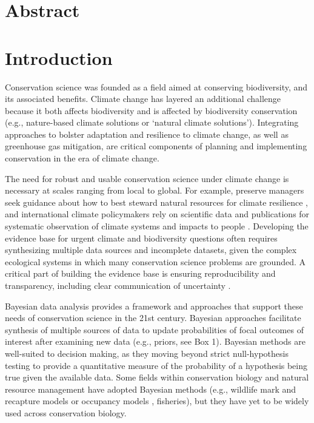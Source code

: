 \documentclass{article}
\begin{document}

\section*{Abstract} 



\newpage
\section* {Introduction}

Conservation science was founded as a field aimed at conserving biodiversity, and its associated benefits. Climate change has layered an additional challenge because it both affects biodiversity and is affected by biodiversity conservation (e.g., nature-based climate solutions or `natural climate solutions'). %
Integrating approaches to bolster adaptation and resilience to climate change, as well as greenhouse gas mitigation, are critical components of planning and implementing conservation in the era of climate change.

\par The need for robust and usable conservation science under climate change is necessary at scales ranging from local to global. For example, preserve managers seek guidance about how to best steward natural resources for climate resilience \citep{Nadeau2015}, and  international climate policymakers rely on scientific data and publications for systematic observation of climate systems and impacts to people \cite{ipcc2007}. Developing the evidence base for urgent climate and biodiversity questions often requires synthesizing multiple data sources and incomplete datasets, given the complex ecological systems in which many conservation science problems are grounded. A critical part of building the evidence base is ensuring reproducibility and transparency, including clear communication of uncertainty \citep{ellis2024principles,ipcc2007}. 

\par Bayesian data analysis provides a framework and approaches that support these needs of conservation science in the 21st century. Bayesian approaches facilitate synthesis of multiple sources of data to update probabilities of focal outcomes of interest after examining new data (e.g., priors, see Box 1). Bayesian methods are well-suited to decision making, as they moving beyond strict null-hypothesis testing to provide a quantitative measure of the probability of a hypothesis being true given the available data. Some fields within conservation biology and natural resource management have adopted Bayesian methods (e.g., wildlife mark and recapture models or occupancy models \citep{Kery2011}, fisheries\citep{Doll2018}), but they have yet to be widely used across conservation biology.
\end{document}
